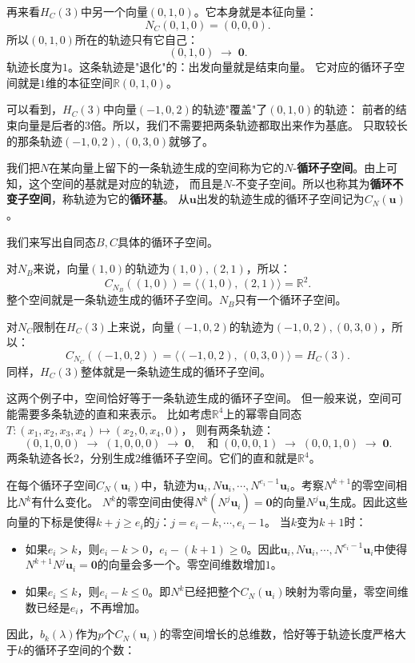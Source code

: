\documentclass[12pt,UTF8]{ctexbook}
\begin{document}
再来看$H_C(3)$中另一个向量$(0,1,0)$。它本身就是本征向量：
$$
N_C(0,1,0) = (0,0,0).
$$
所以$(0,1,0)$所在的轨迹只有它自己：
$$
(0,1,0) \;\longrightarrow\; \mathbf{0}.
$$
轨迹长度为$1$。这条轨迹是"退化"的：出发向量就是结束向量。
它对应的循环子空间就是$1$维的本征空间$\mathbb{R}(0,1,0)$。

可以看到，$H_C(3)$中向量$(-1,0,2)$的轨迹"覆盖"了$(0,1,0)$的轨迹：
前者的结束向量是后者的$3$倍。所以，我们不需要把两条轨迹都取出来作为基底。
只取较长的那条轨迹$(-1,0,2), (0,3,0)$就够了。

我们把$N$在某向量上留下的一条轨迹生成的空间称为它的$N$-\textbf{循环子空间}。由上可知，这个空间的基就是对应的轨迹，
而且是$N$-不变子空间。所以也称其为\textbf{循环不变子空间}，称轨迹为它的\textbf{循环基}。
从$\mathbf{u}$出发的轨迹生成的循环子空间记为$C_N(\mathbf{u})$。

我们来写出自同态$B,C$具体的循环子空间。

对$N_B$来说，向量$(1,0)$的轨迹为$(1,0), (2,1)$，所以：
$$
C_{N_B}((1,0)) = \langle (1,0),\, (2,1) \rangle = \mathbb{R}^2.
$$
整个空间就是一条轨迹生成的循环子空间。$N_B$只有一个循环子空间。

对$N_C$限制在$H_C(3)$上来说，向量$(-1,0,2)$的轨迹为$(-1,0,2), (0,3,0)$，所以：
$$
C_{N_C}((-1,0,2)) = \langle (-1,0,2),\, (0,3,0) \rangle = H_C(3).
$$
同样，$H_C(3)$整体就是一条轨迹生成的循环子空间。

这两个例子中，空间恰好等于一条轨迹生成的循环子空间。
但一般来说，空间可能需要多条轨迹的直和来表示。
比如考虑$\mathbb{R}^4$上的幂零自同态$T: (x_1,x_2,x_3,x_4) \mapsto (x_2, 0, x_4, 0)$，
则有两条轨迹：
$$
(0,1,0,0) \;\longrightarrow\; (1,0,0,0) \;\longrightarrow\; \mathbf{0}, \quad \mbox{和}\; (0,0,0,1) \;\longrightarrow\; (0,0,1,0) \;\longrightarrow\; \mathbf{0}.
$$
两条轨迹各长$2$，分别生成$2$维循环子空间。它们的直和就是$\mathbb{R}^4$。

在每个循环子空间$C_N(\mathbf{u}_i)$中，轨迹为$\mathbf{u}_i, N\mathbf{u}_i, \cdots, N^{e_i - 1}\mathbf{u}_i$。考察$N^{k+1}$的零空间相比$N^k$有什么变化。
$N^k$的零空间由使得$N^k(N^j\mathbf{u}_i)=\mathbf{0}$的向量$N^j\mathbf{u}_i$生成。因此这些向量的下标是使得$k+j\geqslant e_i$的$j$：$j=e_i-k, \cdots, e_i - 1$。
当$k$变为$k+1$时：
\begin{itemize}
\item 如果$e_i > k$，则$e_i-k>0$，$e_i-(k+1)\geqslant 0$。因此$\mathbf{u}_i, N\mathbf{u}_i, \cdots, N^{e_i - 1}\mathbf{u}_i$中使得$N^{k+1}N^j\mathbf{u}_i = \mathbf{0}$的向量会多一个。零空间维数增加$1$。
\item 如果$e_i \leqslant k$，则$e_i - k \leqslant 0$。即$N^k$已经把整个$C_N(\mathbf{u}_i)$映射为零向量，零空间维数已经是$e_i$，不再增加。
\end{itemize}
因此，$b_k(\lambda)$作为$p$个$C_N(\mathbf{u}_i)$的零空间增长的总维数，恰好等于轨迹长度严格大于$k$的循环子空间的个数：
\end{document}
